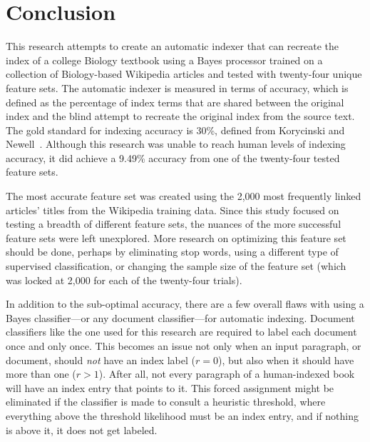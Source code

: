 \pagebreak
\section{Conclusion}

This research attempts to create an automatic indexer that can recreate the index of a college Biology textbook using a \naive Bayes processor trained on a collection of Biology-based Wikipedia articles and tested with twenty-four unique feature sets.
The automatic indexer is measured in terms of accuracy, which is defined as the percentage of index terms that are shared between the original index and the blind attempt to recreate the original index from the source text.
The gold standard for indexing accuracy is 30\%, defined from Korycinski and Newell~\cite{automatic-indexing}.
Although this research was unable to reach human levels of indexing accuracy, it did achieve a 9.49\% accuracy from one of the twenty-four tested feature sets.

The most accurate feature set was created using the 2,000 most frequently linked articles' titles from the Wikipedia training data.
Since this study focused on testing a breadth of different feature sets, the nuances of the more successful feature sets were left unexplored.
More research on optimizing this feature set should be done, perhaps by eliminating stop words, using a different type of supervised classification, or changing the sample size of the feature set (which was locked at 2,000 for each of the twenty-four trials).

In addition to the sub-optimal accuracy, there are a few overall flaws with using a \naive Bayes classifier---or any document classifier---for automatic indexing.
Document classifiers like the one used for this research are required to label each document once and only once.
This becomes an issue not only when an input paragraph, or document, should {\it not} have an index label ($r = 0$), but also when it should have more than one ($r > 1$).
After all, not every paragraph of a human-indexed book will have an index entry that points to it.
This forced assignment might be eliminated if the classifier is made to consult a heuristic threshold, where everything above the threshold likelihood must be an index entry, and if nothing is above it, it does not get labeled.

